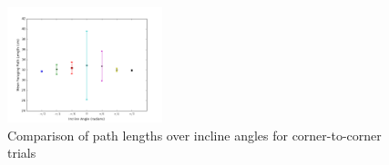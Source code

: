 \begin{figure}[!htb]
\includegraphics[width=0.4\textwidth]{img/corner-to-cornermeanforagingpathlength.png}
\caption{Comparison of path lengths over incline angles for corner-to-corner trials}
\end{figure}
